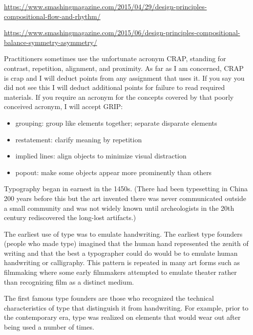 \url{https://www.smashingmagazine.com/2015/04/29/design-principles-compositional-flow-and-rhythm/}

\url{https://www.smashingmagazine.com/2015/06/design-principles-compositional-balance-symmetry-asymmetry/}

\hypertarget{get-a-grip-and-forget-about-crap}{%
\label{get-a-grip-and-forget-about-crap}}

Practitioners sometimes use the unfortunate acronym CRAP, standing for
contrast, repetition, alignment, and proximity. As far as I am
concerned, CRAP is crap and I will deduct points from any assignment
that uses it. If you say you did not see this I will deduct additional
points for failure to read required materials. If you require an acronym
for the concepts covered by that poorly conceived acronym, I will accept
GRIP:

\begin{itemize}
\tightlist
\item
  grouping: group like elements together; separate disparate elements
\item
  restatement: clarify meaning by repetition
\item
  implied lines: align objects to minimize visual distraction
\item
  popout: make some objects appear more prominently than others
\end{itemize}

\hypertarget{changes-in-type-over-time}{%
\label{changes-in-type-over-time}}

Typography began in earnest in the 1450s. (There had been typesetting in
China 200 years before this but the art invented there was never
communicated outside a small community and was not widely known until
archeologists in the 20th century rediscovered the long-lost artifacts.)

The earliest use of type was to emulate handwriting. The earliest type
founders (people who made type) imagined that the human hand represented
the zenith of writing and that the best a typographer could do would be
to emulate human handwriting or calligraphy. This pattern is repeated in
many art forms such as filmmaking where some early filmmakers attempted
to emulate theater rather than recognizing film as a distinct medium.

The first famous type founders are those who recognized the technical
characteristics of type that distinguish it from handwriting. For
example, prior to the contemporary era, type was realized on elements
that would wear out after being used a number of times.

